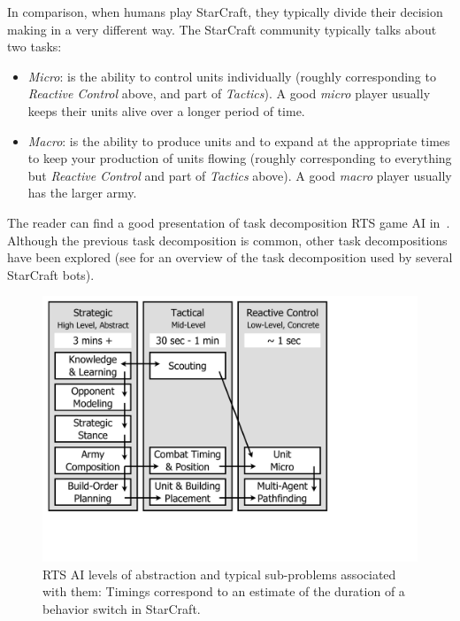 \documentclass{llncs}
\begin{document}
In comparison, when humans play StarCraft, they typically divide their
decision  making in  a  very different  way.  The StarCraft  community
typically talks about two tasks:
\begin{itemize}
\item  {\em  Micro}: is  the  ability  to control  units  individually
  (roughly corresponding to {\em Reactive  Control} above, and part of
  {\em Tactics}). A good \emph{micro} player usually keeps their units
  alive over a longer period of time.
\item {\em  Macro}: is the ability  to produce units and  to expand at
  the  appropriate times  to  keep your  production  of units  flowing
  (roughly corresponding to everything  but {\em Reactive Control} and
  part of {\em Tactics} above). A good \emph{macro} player usually has
  the larger army.
\end{itemize}

The reader can find a good  presentation of task decomposition RTS game AI in~\cite{weber2011acs}.  Although  the   previous  task decomposition  is  common, other task decompositions have been explored (see \cite{ontanon2013survey} for an overview of the task decomposition used by several StarCraft bots).

\begin{figure}
    \centering
    \includegraphics[width=0.7\columnwidth]{categories}
    \caption{RTS  AI  levels  of abstraction  and  typical sub-problems associated with them:
      Timings correspond  to  an
      estimate   of   the   duration   of   a   behavior   switch   in
      StarCraft. %
      }
    \label{fig:levels-abstraction}
\end{figure}
\end{document}
